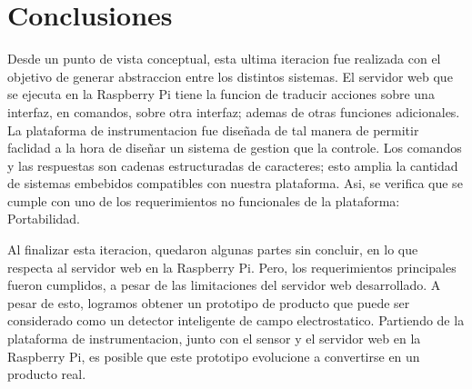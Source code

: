 
\section{Conclusiones} %
\label{it7:sec:conclusiones}

Desde un punto de vista conceptual, esta ultima iteracion fue realizada con el objetivo de generar abstraccion entre los distintos sistemas. El servidor web que se ejecuta en la Raspberry Pi tiene la funcion de traducir acciones sobre una interfaz, en comandos, sobre otra interfaz; ademas de otras funciones adicionales. La plataforma de instrumentacion fue diseñada de tal manera de permitir faclidad a la hora de diseñar un sistema de gestion que la controle. Los comandos y las respuestas son cadenas estructuradas de caracteres; esto amplia la cantidad de sistemas embebidos compatibles con nuestra plataforma. Asi, se verifica que se cumple con uno de los requerimientos no funcionales de la plataforma: Portabilidad.

Al finalizar esta iteracion, quedaron algunas partes sin concluir, en lo que respecta al servidor web en la Raspberry Pi. Pero, los requerimientos principales fueron cumplidos, a pesar de las limitaciones del servidor web desarrollado.
A pesar de esto, logramos obtener un prototipo de producto que puede ser considerado como un detector inteligente de campo electrostatico. Partiendo de la plataforma de instrumentacion, junto con el sensor y el servidor web en la Raspberry Pi, es posible que este prototipo evolucione a convertirse en un producto real.



